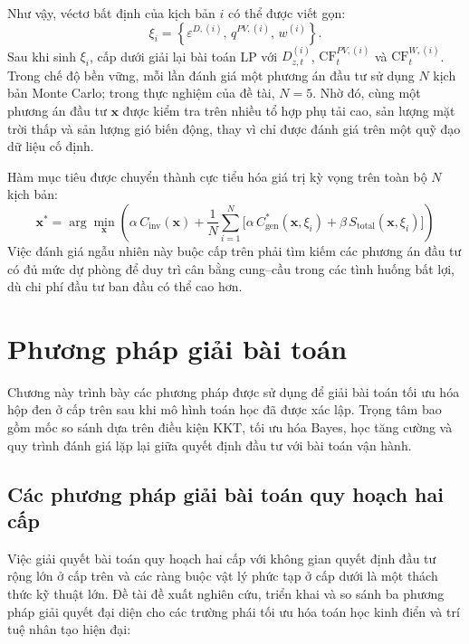 Như vậy, véctơ bất định của kịch bản $i$ có thể được viết gọn:
\begin{equation}
    \xi_i =
    \left\{
    \varepsilon^{D,(i)},\,
    q^{PV,(i)},\,
    w^{(i)}
    \right\}.
    \label{eq:mc_uncertainty_vector}
\end{equation}
Sau khi sinh $\xi_i$, cấp dưới giải lại bài toán LP với $D_{z,t}^{(i)}$, $\mathrm{CF}_{t}^{PV,(i)}$ và $\mathrm{CF}_{t}^{W,(i)}$. Trong chế độ bền vững, mỗi lần đánh giá một phương án đầu tư sử dụng $N$ kịch bản Monte Carlo; trong thực nghiệm của đề tài, $N=5$. Nhờ đó, cùng một phương án đầu tư $\mathbf{x}$ được kiểm tra trên nhiều tổ hợp phụ tải cao, sản lượng mặt trời thấp và sản lượng gió biến động, thay vì chỉ được đánh giá trên một quỹ đạo dữ liệu cố định.

Hàm mục tiêu được chuyển thành cực tiểu hóa giá trị kỳ vọng trên toàn bộ $N$ kịch bản:
\begin{equation}
    \mathbf{x}^* = \arg\min_{\mathbf{x}} \left( \alpha \, C_{\text{inv}}(\mathbf{x}) + \frac{1}{N} \sum_{i=1}^N \Big[ \alpha \, C_{\text{gen}}^*(\mathbf{x}, \xi_i) + \beta \, S_{\text{total}}(\mathbf{x}, \xi_i) \Big] \right)
\end{equation}
Việc đánh giá ngẫu nhiên này buộc cấp trên phải tìm kiếm các phương án đầu tư có đủ mức dự phòng để duy trì cân bằng cung--cầu trong các tình huống bất lợi, dù chi phí đầu tư ban đầu có thể cao hơn.

\chapter{Phương pháp giải bài toán}
\label{chap:solution-method}

Chương này trình bày các phương pháp được sử dụng để giải bài toán tối ưu hóa hộp đen ở cấp trên sau khi mô hình toán học đã được xác lập. Trọng tâm bao gồm mốc so sánh dựa trên điều kiện KKT, tối ưu hóa Bayes, học tăng cường và quy trình đánh giá lặp lại giữa quyết định đầu tư với bài toán vận hành.

\section{Các phương pháp giải bài toán quy hoạch hai cấp}

Việc giải quyết bài toán quy hoạch hai cấp với không gian quyết định đầu tư rộng lớn ở cấp trên và các ràng buộc vật lý phức tạp ở cấp dưới là một thách thức kỹ thuật lớn. Đề tài đề xuất nghiên cứu, triển khai và so sánh ba phương pháp giải quyết đại diện cho các trường phái tối ưu hóa toán học kinh điển và trí tuệ nhân tạo hiện đại:

